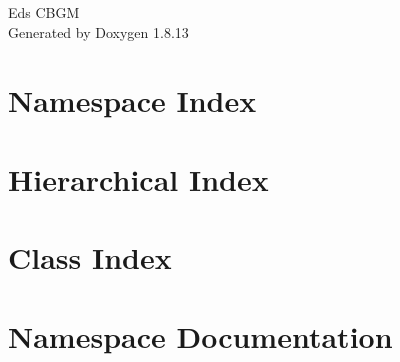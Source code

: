 \documentclass[twoside]{book}
\newcommand{\+}{\discretionary{\mbox{\scriptsize$\hookleftarrow$}}{}{}}
\newcommand{\clearemptydoublepage}{%
  \newpage{\pagestyle{empty}\cleardoublepage}%
}
\begin{document}
\hypersetup{pageanchor=false,
             bookmarksnumbered=true,
             pdfencoding=unicode
            }
\begin{titlepage}
\vspace*{7cm}
\begin{center}%
{\Large Ed\textquotesingle{}s C\+B\+GM }\\
\vspace*{1cm}
{\large Generated by Doxygen 1.8.13}\\
\end{center}
\end{titlepage}
\clearemptydoublepage
{}
\tableofcontents
\clearemptydoublepage
{}
\hypersetup{pageanchor=true}

\chapter{Namespace Index}

\chapter{Hierarchical Index}

\chapter{Class Index}

\chapter{Namespace Documentation}






\end{document}
